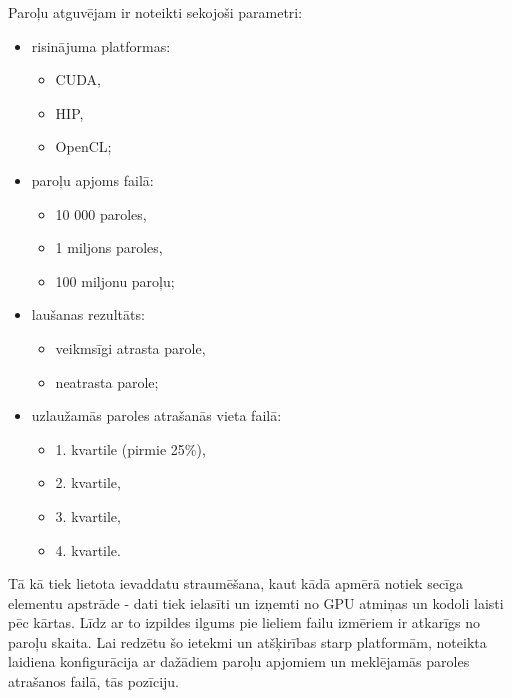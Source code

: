 Paroļu atguvējam ir noteikti sekojoši parametri: \cite{kursa-darbs}
\begin{itemize}
    \item risinājuma platformas:
    \begin{itemize}
        \item CUDA,
        \item HIP,
        \item OpenCL;
    \end{itemize}
    \item paroļu apjoms failā:
    \begin{itemize}
        \item 10 000 paroles,
        \item 1 miljons paroles,
        \item 100 miljonu paroļu;
    \end{itemize}
    \item laušanas rezultāts:
    \begin{itemize}
        \item veikmsīgi atrasta parole,
        \item neatrasta parole;
    \end{itemize}
    \item uzlaužamās paroles atrašanās vieta failā:
    \begin{itemize}
        \item 1. kvartile (pirmie 25\%),
        \item 2. kvartile,
        \item 3. kvartile,
        \item 4. kvartile.
    \end{itemize}
\end{itemize}


Tā kā tiek lietota ievaddatu straumēšana, kaut kādā apmērā notiek secīga
elementu apstrāde - dati tiek ielasīti un izņemti no GPU atmiņas un kodoli
laisti pēc kārtas. Līdz ar to izpildes ilgums pie lieliem failu izmēriem ir
atkarīgs no paroļu skaita. Lai redzētu šo ietekmi un atšķirības starp
platformām, noteikta laidiena konfigurācija ar dažādiem paroļu apjomiem un
meklējamās paroles atrašanos failā, tās pozīciju.

